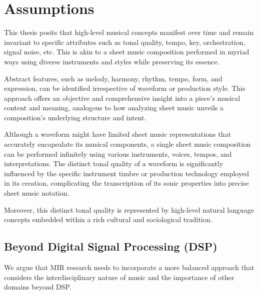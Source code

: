 \section{Assumptions}

This thesis posits that high-level musical concepts manifest over time and remain invariant to specific attributes such as tonal quality, tempo, key, orchestration, signal noise, etc. This is akin to a sheet music composition performed in myriad ways using diverse instruments and styles while preserving its essence.

Abstract features, such as melody, harmony, rhythm, tempo, form, and expression, can be identified irrespective of waveform or production style. This approach offers an objective and comprehensive insight into a piece's musical content and meaning, analogous to how analyzing sheet music unveils a composition's underlying structure and intent.

Although a waveform might have limited sheet music representations that accurately encapsulate its musical components, a single sheet music composition can be performed infinitely using various instruments, voices, tempos, and interpretations. The distinct tonal quality of a waveform is significantly influenced by the specific instrument timbre or production technology employed in its creation, complicating the transcription of its sonic properties into precise sheet music notation.

Moreover, this distinct tonal quality is represented by high-level natural language concepts embedded within a rich cultural and sociological tradition.

\subsection{Beyond Digital Signal Processing (DSP)}

We argue that MIR research needs to incorporate a more balanced approach that considers the interdisciplinary nature of music and the importance of other domains beyond DSP.